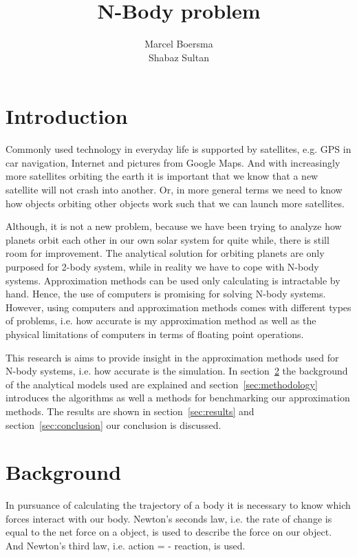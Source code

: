 \documentclass[11pt]{article} %
\title{N-Body problem}
\author{Marcel Boersma\\Shabaz Sultan}
\begin{document}
\maketitle

\section{Introduction}
Commonly used technology in everyday life is supported by satellites, e.g. GPS in car navigation, Internet and pictures from Google Maps. 
And with increasingly more satellites orbiting the earth it is important that we know that a new satellite will not crash into another.
Or, in more general terms we need to know how objects orbiting other objects work such that we can launch more satellites.

Although, it is not a new problem, because we have been trying to analyze how planets orbit each other in our own solar system for quite while, there is still room for improvement.
The analytical solution for orbiting planets are only purposed for 2-body system, while in reality we have to cope with N-body systems. Approximation methods can be used only calculating is intractable by hand. Hence, the use of computers is promising for solving N-body systems. However, using computers and approximation methods comes with different types of problems, i.e. how accurate is my approximation method as well as the physical limitations of computers in terms of floating point operations.

This research is aims to provide insight in the approximation methods used for N-body systems, i.e. how accurate is the simulation. 
In section~\ref{sec:literature} the background of the analytical models used are explained and section~\ref{sec:methodology} introduces the algorithms as well a methods for benchmarking our approximation methods. The results are shown in section~\ref{sec:results} and section~\ref{sec:conclusion} our conclusion is discussed.

\section{Background}
\label{sec:literature}
In pursuance of calculating the trajectory of a body it is necessary to know which forces interact with our body. Newton's seconds law, i.e. the rate of change is equal to the net force on a object, is used to describe the force on our object. And Newton's third law, i.e. action = - reaction, is used. 
\end{document}
